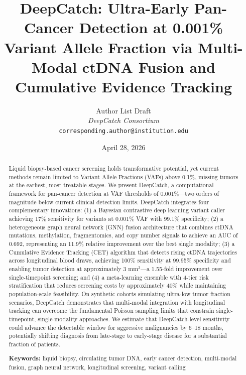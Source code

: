 \documentclass[10pt,a4paper]{article}
\title{\textbf{DeepCatch: Ultra-Early Pan-Cancer Detection at 0.001\% Variant Allele Fraction via Multi-Modal ctDNA Fusion and Cumulative Evidence Tracking}}
\author{
  {Author List Draft}\\
  \textit{DeepCatch Consortium}\\
  \texttt{corresponding.author@institution.edu}
}
\date{April 28, 2026}
\begin{document}
\maketitle


\begin{abstract}
Liquid biopsy-based cancer screening holds transformative potential, yet current methods remain limited to Variant Allele Fractions (VAFs) above 0.1\%, missing tumors at the earliest, most treatable stages. We present DeepCatch, a computational framework for pan-cancer detection at VAF thresholds of 0.001\%—two orders of magnitude below current clinical detection limits. DeepCatch integrates four complementary innovations: (1) a Bayesian contrastive deep learning variant caller achieving 17\% sensitivity for variants at 0.001\% VAF with 99.1\% specificity; (2) a heterogeneous graph neural network (GNN) fusion architecture that combines ctDNA mutations, methylation, fragmentomics, and copy number signals to achieve an AUC of 0.692, representing an 11.9\% relative improvement over the best single modality; (3) a Cumulative Evidence Tracking (CET) algorithm that detects rising ctDNA trajectories across longitudinal blood draws, achieving 100\% sensitivity at 99.95\% specificity and enabling tumor detection at approximately 3 mm$^3$—a 1.55-fold improvement over single-timepoint screening; and (4) a meta-learning ensemble with 4-tier risk stratification that reduces screening costs by approximately 40\% while maintaining population-scale feasibility. On synthetic cohorts simulating ultra-low tumor fraction scenarios, DeepCatch demonstrates that multi-modal integration with longitudinal tracking can overcome the fundamental Poisson sampling limits that constrain single-timepoint, single-modality approaches. We estimate that DeepCatch-level sensitivity could advance the detectable window for aggressive malignancies by 6--18 months, potentially shifting diagnosis from late-stage to early-stage disease for a substantial fraction of patients.

\textbf{Keywords:} liquid biopsy, circulating tumor DNA, early cancer detection, multi-modal fusion, graph neural network, longitudinal screening, variant calling
\end{abstract}

\end{document}
